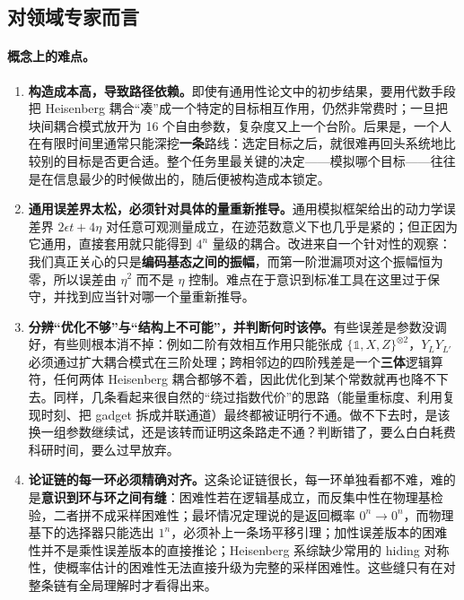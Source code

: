 \documentclass[11pt,a4paper,fontset=none]{ctexart}
\begin{document}
\subsection{对领域专家而言}

\paragraph{概念上的难点。}

\begin{enumerate}[label=\textbf{\arabic*.},leftmargin=1.5em,itemsep=0.5em]
  \item \textbf{构造成本高，导致路径依赖。}即使有通用性论文中的初步结果，要用代数手段把 Heisenberg 耦合“凑”成一个特定的目标相互作用，仍然非常费时；一旦把块间耦合模式放开为 16 个自由参数，复杂度又上一个台阶。后果是，一个人在有限时间里通常只能深挖\textbf{一条}路线：选定目标之后，就很难再回头系统地比较别的目标是否更合适。整个任务里最关键的决定——模拟哪个目标——往往是在信息最少的时候做出的，随后便被构造成本锁定。

  \item \textbf{通用误差界太松，必须针对具体的量重新推导。}通用模拟框架给出的动力学误差界 $2\epsilon t+4\eta$\cite{CMP2018} 对任意可观测量成立，在迹范数意义下也几乎是紧的；但正因为它通用，直接套用就只能得到 $4^n$ 量级的耦合。改进来自一个针对性的观察：我们真正关心的只是\textbf{编码基态之间的振幅}，而第一阶泄漏项对这个振幅恒为零，所以误差由 $\eta^2$ 而不是 $\eta$ 控制。难点在于意识到标准工具在这里过于保守，并找到应当针对哪一个量重新推导。

  \item \textbf{分辨“优化不够”与“结构上不可能”，并判断何时该停。}有些误差是参数没调好，有些则根本消不掉：例如二阶有效相互作用只能张成 $\{\mathbb 1,X,Z\}^{\otimes 2}$，$Y_LY_{L'}$ 必须通过扩大耦合模式在三阶处理；跨相邻边的四阶残差是一个\textbf{三体}逻辑算符，任何两体 Heisenberg 耦合都够不着，因此优化到某个常数就再也降不下去。同样，几条看起来很自然的“绕过指数代价”的思路（能量重标度、利用复现时刻、把 gadget 拆成并联通道）最终都被证明行不通。做不下去时，是该换一组参数继续试，还是该转而证明这条路走不通？判断错了，要么白白耗费科研时间，要么过早放弃。

  \item \textbf{论证链的每一环必须精确对齐。}这条论证链很长，每一环单独看都不难，难的是\textbf{意识到环与环之间有缝}：困难性若在逻辑基成立，而反集中性在物理基检验，二者拼不成采样困难性；最坏情况定理说的是返回概率 $0^n\!\to\!0^n$，而物理基下的选择器只能选出 $1^n$，必须补上一条场平移引理；加性误差版本的困难性并不是乘性误差版本的直接推论；Heisenberg 系综缺少常用的 hiding 对称性，使概率估计的困难性无法直接升级为完整的采样困难性。这些缝只有在对整条链有全局理解时才看得出来。
\end{enumerate}
\end{document}
